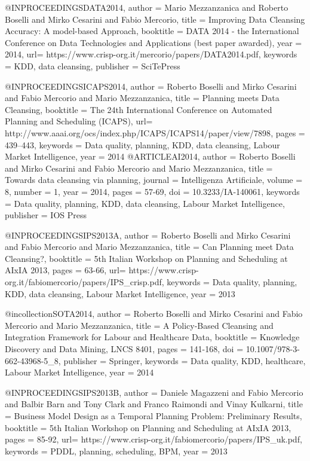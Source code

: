 {{{    }


@INPROCEEDINGS{DATA2014,
  author = {Mario Mezzanzanica and Roberto Boselli and Mirko Cesarini and Fabio Mercorio},
  title = {Improving Data Cleansing Accuracy: A model-based Approach},
  booktitle = {DATA 2014 -  the International Conference on Data Technologies and Applications 
  (best paper awarded)},
  year = {2014},
  url= {https://www.crisp-org.it/mercorio/papers/DATA2014.pdf},
  keywords = {KDD, data cleansing},
  publisher = {SciTePress}
  }


@INPROCEEDINGS{ICAPS2014,
  author = {Roberto Boselli  and Mirko Cesarini and Fabio Mercorio and Mario Mezzanzanica},
  title = {Planning meets Data Cleansing},
  booktitle = {The 24th International Conference on Automated Planning and Scheduling (ICAPS)},
  url= {http://www.aaai.org/ocs/index.php/ICAPS/ICAPS14/paper/view/7898},
  pages = {439--443},
  keywords = {Data quality, planning, KDD, data cleansing, Labour Market Intelligence},
  year = {2014}
}
@ARTICLE{AI2014,
  author = {Roberto Boselli  and Mirko Cesarini and Fabio Mercorio and Mario Mezzanzanica},
  title = {Towards data cleansing via planning},
  journal = {Intelligenza Artificiale},
  volume = {8},
  number = {1},
  year = {2014},
  pages = {57-69},
  doi = {10.3233/IA-140061},
  keywords = {Data quality, planning, KDD, data cleansing, Labour Market Intelligence},
  publisher = {IOS Press}
}


@INPROCEEDINGS{IPS2013A,
  author = {Roberto Boselli  and Mirko Cesarini and Fabio Mercorio and Mario Mezzanzanica},
  title = {Can Planning meet Data Cleansing?},
  booktitle = {5th Italian Workshop on Planning and Scheduling at AIxIA 2013},
  pages = {63-66},
  url= {https://www.crisp-org.it/fabiomercorio/papers/IPS_crisp.pdf},
  keywords = {Data quality, planning, KDD, data cleansing, Labour Market Intelligence},
  year = {2013}
}

@incollection{SOTA2014,
  author = {Roberto Boselli  and Mirko Cesarini and Fabio Mercorio and Mario Mezzanzanica},
  title = {A Policy-Based Cleansing and Integration Framework for Labour and Healthcare Data},
  booktitle = {Knowledge Discovery and Data Mining, LNCS 8401},
  pages = {141-168},
  doi = {10.1007/978-3-662-43968-5_8},
 publisher = {Springer},
 keywords = {Data quality, KDD, healthcare, Labour Market Intelligence},
  year = {2014}
}

@INPROCEEDINGS{IPS2013B,
  author = {Daniele Magazzeni and Fabio Mercorio and Balbir Barn and Tony Clark and Franco Raimondi
 and Vinay Kulkarni},
  title = {Business Model Design as a Temporal Planning Problem: Preliminary Results},
  booktitle = {5th Italian Workshop on Planning and Scheduling at AIxIA 2013},
  pages = {85-92},
  url= {https://www.crisp-org.it/fabiomercorio/papers/IPS_uk.pdf},
  keywords = {PDDL, planning, scheduling, BPM},
  year = {2013}
}



}}
